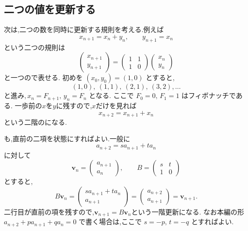 \subsection{二つの値を更新する}\label{節：二つの値を更新する}

次は,二つの数を同時に更新する規則を考える.例えば
\[
  x_{n+1}=x_n+y_n,
  \qquad
  y_{n+1}=x_n
\]
という二つの規則は
\[
  \begin{pmatrix}x_{n+1}\\y_{n+1}\end{pmatrix}
  =
  \begin{pmatrix}1&1\\1&0\end{pmatrix}
  \begin{pmatrix}x_n\\y_n\end{pmatrix}
\]
と一つので表せる.
初めを $(x_0,y_0)=(1,0)$ とすると,
\[
  (1,0),\ (1,1),\ (2,1),\ (3,2),\ldots
\]
と進み,$\,x_n=F_{n+1},\,y_n=F_n$ となる.
ここで $F_0=0,\,F_1=1$ はフィボナッチである.
一歩前の$x$を$y$に残すので,$x$だけを見れば
\[
  x_{n+2}=x_{n+1}+x_n
\]
という二階のになる.

も,直前の二項を状態にすればよい.一般に
\[
  a_{n+2}=s a_{n+1}+t a_n
\]
に対して
\[
  \boldsymbol{v}_n=
  \begin{pmatrix}a_{n+1}\\a_n\end{pmatrix},
  \qquad
  B=\begin{pmatrix}s&t\\1&0\end{pmatrix}
\]
とすると,
\[
  B\boldsymbol{v}_n
  =
  \begin{pmatrix}s a_{n+1}+t a_n\\a_{n+1}\end{pmatrix}
  =
  \begin{pmatrix}a_{n+2}\\a_{n+1}\end{pmatrix}
  =\boldsymbol{v}_{n+1}.
\]
二行目が直前の項を残すので,$\boldsymbol{v}_{n+1}=B\boldsymbol{v}_n$という一階更新になる.
なお本編の形 $a_{n+2}+pa_{n+1}+qa_n=0$ で書く場合は,ここで $s=-p,\,t=-q$ とすればよい.


